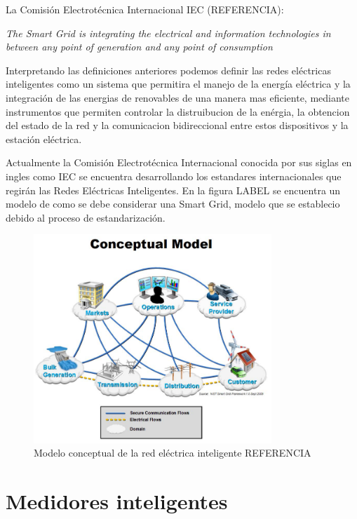   \par La Comisión Electrotécnica Internacional IEC (REFERENCIA):
  \par \textit{The Smart Grid is integrating the electrical and information technologies in between any point of generation and any point of consumption}

  \par Interpretando las definiciones anteriores podemos definir las redes eléctricas inteligentes como un sistema que permitira el manejo de la energía eléctrica y la integración de las energias de renovables de una manera mas eficiente, mediante instrumentos que permiten controlar la distruibucion de la enérgia, la obtencion del estado de la red y la comunicacion bidireccional entre estos dispositivos y la estación eléctrica.

  \par Actualmente la Comisión Electrotécnica Internacional conocida por sus siglas en ingles como IEC se encuentra desarrollando los estandares internacionales que regirán las Redes Eléctricas Inteligentes. En la figura LABEL se encuentra un modelo de como se debe considerar una Smart Grid, modelo que se establecio debido al proceso de estandarización.

  \begin{figure}[H]
    \centering
    \includegraphics[width=0.8\textwidth]{../Imagenes/modelo_SG.png}
    \caption{Modelo conceptual de la red eléctrica inteligente REFERENCIA}
    \label{fig:model_SG}
  \end{figure}


\section{Medidores inteligentes}
  \par

